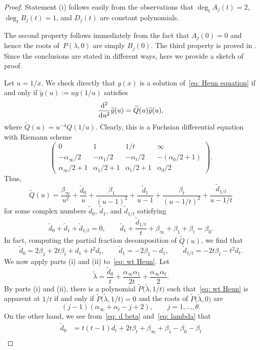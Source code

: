 \documentclass[pdftex]{sigma}
\numberwithin{equation}{section}
\def\wt#1{\widetilde{#1}}
\begin{document}
\begin{proof}
Statement (i) follows easily from the observations that
 $\deg_t A_j(t)=2$, ${\deg_tB_j(t)=1}$, and $D_j(t)$ are
 constant polynomials.

 The second property follows immediately from the fact that
 $A_j(0)=0$ and hence the roots of~$P(\lambda,0)$ are simply
 $B_j(0)$. The third property is proved in \cite[Theorem~B.3]{Chen-Lin-Yang}. Since the conclusions are stated in different
 ways, here we provide a sketch of proof.

 Let $u=1/x$. We check directly that $y(x)$ is a solution of~\eqref{eq: Heun equation} if and only if $\wt y(u):=uy(1/u)$
 satisfies
 \begin{equation} \label{eq: wt Heun}
 \frac{{\rm d}^2}{{\rm d}u^2}\wt y(u)=\wt Q(u)\wt y(u),
 \end{equation}
 where $\wt Q(u)=u^{-4}Q(1/u)$. Clearly, this is a Fuchsian
 differential equation with Riemann scheme
\[
 \begin{pmatrix}
 0 & 1 & 1/t & \infty \\
 -\alpha_\infty/2 & -\alpha_1/2 & -\alpha_t/2 &
 -(\alpha_0/2+1) \\
 \alpha_\infty/2+1 & \alpha_1/2+1 & \alpha_t/2+1
 & \alpha_0/2 \end{pmatrix}.
\]
 Thus,
\[
 \wt Q(u)=\frac{\beta_\infty}{u^2}+\frac{\wt d_0}u
 +\frac{\beta_1}{(u-1)^2}+\frac{\wt d_1}{u-1}
 +\frac{\beta_t}{(u-1/t)^2}+\frac{\wt d_{1/t}}{u-1/t}
\]
 for some complex numbers $\wt d_0$, $\wt d_1$, and $\wt d_{1/t}$
 satisfying
\[
 \wt d_0+\wt d_1+\wt d_{1/t}=0, \qquad
 \wt d_1+\frac{\wt d_{1/t}}t+\beta_\infty+\beta_1+\beta_t=\beta_0.
\]
In fact, computing the partial fraction decomposition of $\wt Q(u)$,
 we find that
\[
 \wt d_0=2\beta_1+2t\beta_t+d_1+t^2d_t, \qquad
 \wt d_1=-2\beta_1-d_1, \qquad
 \wt d_{1/t}=-2t\beta_t-t^2d_t.
\]
 We now apply parts (i) and (ii) to~\eqref{eq: wt Heun}. Let
\[
 \wt\lambda=\frac{\wt d_0}t+\frac{\alpha_\infty\alpha_1}{2t}
 +\frac{\alpha_\infty\alpha_t}2.
\]
 By parts (i) and (ii), there is a polynomial $\wt P\bigl(\wt\lambda,1/t\bigr)$
 such that~\eqref{eq: wt Heun} is apparent at $1/t$ if and only if
 $\wt P\bigl(\wt\lambda,1/t\bigr)=0$ and the roots of $\wt P\bigl(\wt\lambda,0\bigr)$
 are
\[
 (j-1)(\alpha_\infty+\alpha_t-j+2), \qquad
 j=1,\dots,\theta.
\]
 On the other hand, we see from~\eqref{eq: d beta} and~\eqref{eq: lambda} that
 \begin{align*}\wt d_0
 &{}=t(t-1)d_t+2t\beta_t+\beta_\infty+\beta_1-\beta_0-\beta_t\\

\end{align*}
\end{proof}
\end{document}
